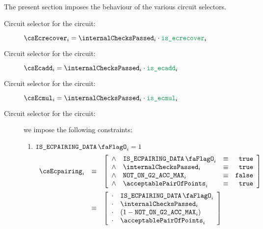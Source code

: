 The present section imposes the behaviour of the various circuit selectors.
\begin{description}
    \item[Circuit selector for the \instEcrecover{} circuit:]
        $\csEcrecover_{i} = \internalChecksPassed_{i} \cdot \locIsEcrecover_{i}$
    \item[Circuit selector for the \instEcadd{} circuit:]
        $\csEcadd_{i} = \internalChecksPassed_{i} \cdot \locIsEcadd_{i}$
    \item[Circuit selector for the \instEcmul{} circuit:]
        $\csEcmul_{i} = \internalChecksPassed_{i} \cdot \locIsEcmul_{i}$
    \item[Circuit selector for the \instEcpairing{} circuit:]
    we impose the following constraints:
        \begin {enumerate}
            \item \If $\isEcpairingData_{i} = 1$ \Then
                \[
                    \begin{array}{lcl}
                        \csEcpairing_{i} & \equiv &
                        \left[ \begin{array}{clcr}
                            \wedge & \isEcpairingData_{i}         & \equiv & \texttt{true}  \\
                            \wedge & \internalChecksPassed_{i}   & \equiv & \texttt{true}  \\
                            \wedge & \notOnGTwoAccMax_{i}        & \equiv & \texttt{false} \\
                            \wedge & \acceptablePairOfPoints_{i} & \equiv & \texttt{true}  \\
                        \end{array} \right] \vspace{2mm} \\
                        & \equiv & 
                        \left[ \begin{array}{clcr}
                            \cdot & \isEcpairingData_{i}         \\
                            \cdot & \internalChecksPassed_{i}   \\
                            \cdot & (1 - \notOnGTwoAccMax_{i})  \\
                            \cdot & \acceptablePairOfPoints_{i} \\
                        \end{array} \right] \vspace{2mm} \\

\end{array}\]
\end{enumerate}
\end{description}

